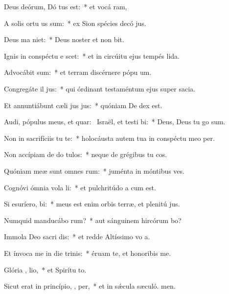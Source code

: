\item Deus deórum, Dó tus est:~* et vocá ram,
\item A solis ortu us  sum:~* ex Sion spécies decó jus.
\item Deus ma niet:~* Deus noster et non bit.
\item Ignis in conspéctu e scet:~* et in circúitu ejus tempés lida.
\item Advocábit  sum:~* et terram discérnere pópu um.
\item Congregáte il  jus:~* qui órdinant testaméntum ejus super sacia.
\item Et annuntiábunt cæli jus jus:~* quóniam De dex est.
\item Audi, pópulus meus, et quar:~\pscross{} Israël, et testi bi:~* Deus, Deus tu go sum.
\item Non in sacrifíciis tu  te:~* holocáusta autem tua in conspéctu meo  per.
\item Non accípiam de do  tulos:~* neque de grégibus tu cos.
\item Quóniam meæ sunt omnes  rum:~* juménta in móntibus  ves.
\item Cognóvi ómnia vola li:~* et pulchritúdo a cum est.
\item Si esuríero,   bi:~* meus est enim orbis terræ, et plenitú jus.
\item Numquid manducábo  rum?~* aut sánguinem hircórum bo?
\item Immola Deo sacri dis:~* et redde Altíssimo vo a.
\item Et ínvoca me in die trinis:~* éruam te, et honoribis me.
\item Glória ,  lio,~* et Spirítu to.
\item Sicut erat in princípio,  ,  per,~* et in sǽcula sæculó. men.

